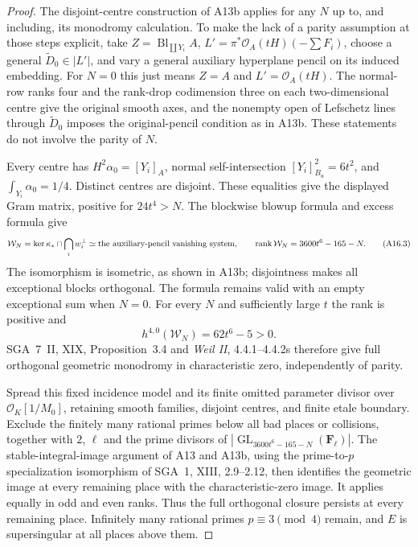 \documentclass[11pt]{article}
\theoremstyle{remark}\newtheorem{remark}[theorem]{Remark}
\begin{document}
\begin{proof}
The disjoint-centre construction of A13b applies for any
$N$ up to, and including, its monodromy calculation. To
make the lack of a parity assumption at those steps
explicit, take $Z=\operatorname{Bl}_{\coprod Y_i}A$,
$L'=\pi^*\mathcal O_A(tH)(-\sum F_i)$, choose a general
$\widetilde D_0\in|L'|$, and vary a general auxiliary
hyperplane pencil on its induced embedding. For $N=0$
this just means $Z=A$ and $L'=\mathcal O_A(tH)$.
The normal-row ranks four and the rank-drop codimension
three on each two-dimensional centre give the original
smooth axes, and the nonempty open of Lefschetz lines
through $\widetilde D_0$ imposes the original-pencil
condition as in A13b. These statements do not involve
the parity of $N$.

Every centre has $H^2\alpha_0=[Y_i]_A$, normal self-intersection
$[Y_i]^2_{B_u}=6t^2$, and $\int_{Y_i}\alpha_0=1/4$.
Distinct centres are disjoint. These equalities give
the displayed Gram matrix, positive for $24t^4>N$.
The blockwise blowup formula and excess formula give
\[
 \mathcal W_N=\ker\kappa_*\cap\bigcap_iw_i^\perp
       \simeq \hbox{the auxiliary-pencil vanishing system},
 \qquad
 \operatorname{rank}\mathcal W_N=3600t^6-165-N.
 \tag{A16.3}
\]
The isomorphism is isometric, as shown in A13b; disjointness
makes all exceptional blocks orthogonal. The formula remains
valid with an empty exceptional sum when $N=0$.
For every $N$ and sufficiently large $t$ the rank is positive
and
\[
                  h^{4,0}(\mathcal W_N)=62t^6-5>0.
\]
SGA~7~II, XIX, Proposition~3.4 and \emph{Weil II},
4.4.1--4.4.2s therefore give full orthogonal geometric
monodromy in characteristic zero, independently of parity.

Spread this fixed incidence model and its finite omitted
parameter divisor over $\mathcal O_K[1/M_0]$, retaining
smooth families, disjoint centres, and finite etale
boundary. Exclude the finitely many rational primes below
all bad places or collisions, together with $2$, $\ell$
and the prime divisors of
$|\operatorname{GL}_{3600t^6-165-N}(\mathbf F_\ell)|$.
The stable-integral-image argument of A13 and A13b, using
the prime-to-$p$ specialization isomorphism of SGA~1,
XIII, 2.9--2.12, then identifies the geometric image at
every remaining place with the characteristic-zero image.
It applies equally in odd and even ranks. Thus the full
orthogonal closure persists at every remaining place.
Infinitely many rational primes $p\equiv3\pmod4$ remain,
and $E$ is supersingular at all places above them.


\end{proof}
\end{document}
